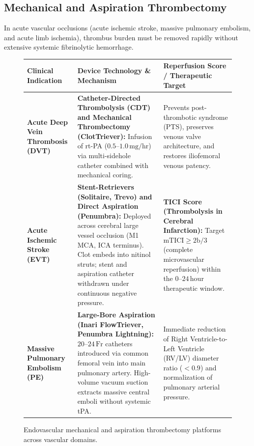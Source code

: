 \documentclass[11pt,a4paper]{article}
\begin{document}
\subsection{Mechanical and Aspiration Thrombectomy}

In acute vascular occlusions (acute ischemic stroke, massive pulmonary embolism, and acute limb ischemia), thrombus burden must be removed rapidly without extensive systemic fibrinolytic hemorrhage.

\begin{figure}[htbp]
\centering
\setlength{\tabcolsep}{4pt}
\begin{tabular}{p{3.8cm}p{5.5cm}p{5.5cm}}
\toprule
\textbf{Clinical Indication} & \textbf{Device Technology \& Mechanism} & \textbf{Reperfusion Score / Therapeutic Target} \\
\midrule
\textbf{Acute Deep Vein Thrombosis (DVT)} & \textbf{Catheter-Directed Thrombolysis (CDT) and Mechanical Thrombectomy (ClotTriever):} Infusion of rt-PA ($0.5\text{--}1.0\,\text{mg/hr}$) via multi-sidehole catheter combined with mechanical coring. & Prevents post-thrombotic syndrome (PTS), preserves venous valve architecture, and restores iliofemoral venous patency. \\
\addlinespace
\textbf{Acute Ischemic Stroke (EVT)} & \textbf{Stent-Retrievers (Solitaire, Trevo) and Direct Aspiration (Penumbra):} Deployed across cerebral large vessel occlusion (M1 MCA, ICA terminus). Clot embeds into nitinol struts; stent and aspiration catheter withdrawn under continuous negative pressure. & \textbf{TICI Score (Thrombolysis in Cerebral Infarction):} Target $\text{mTICI} \ge 2\text{b/3}$ (complete microvascular reperfusion) within the $0\text{--}24\,\text{hour}$ therapeutic window. \\
\addlinespace
\textbf{Massive Pulmonary Embolism (PE)} & \textbf{Large-Bore Aspiration (Inari FlowTriever, Penumbra Lightning):} $20\text{--}24\,\text{Fr}$ catheters introduced via common femoral vein into main pulmonary artery. High-volume vacuum suction extracts massive central emboli without systemic tPA. & Immediate reduction of Right Ventricle-to-Left Ventricle (RV/LV) diameter ratio ($< 0.9$) and normalization of pulmonary arterial pressure. \\
\bottomrule
\end{tabular}
\caption{Endovascular mechanical and aspiration thrombectomy platforms across vascular domains.}
\label{tab:thrombectomy}
\end{figure}

\newpage
\end{document}
